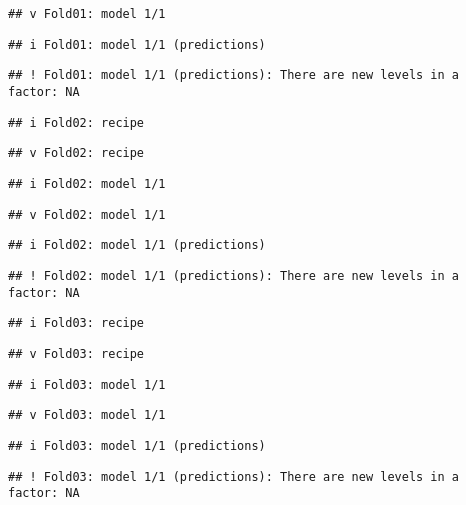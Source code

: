 \documentclass[
]{article}
\begin{document}
\begin{verbatim}
## v Fold01: model 1/1
\end{verbatim}

\begin{verbatim}
## i Fold01: model 1/1 (predictions)
\end{verbatim}

\begin{verbatim}
## ! Fold01: model 1/1 (predictions): There are new levels in a factor: NA
\end{verbatim}

\begin{verbatim}
## i Fold02: recipe
\end{verbatim}

\begin{verbatim}
## v Fold02: recipe
\end{verbatim}

\begin{verbatim}
## i Fold02: model 1/1
\end{verbatim}

\begin{verbatim}
## v Fold02: model 1/1
\end{verbatim}

\begin{verbatim}
## i Fold02: model 1/1 (predictions)
\end{verbatim}

\begin{verbatim}
## ! Fold02: model 1/1 (predictions): There are new levels in a factor: NA
\end{verbatim}

\begin{verbatim}
## i Fold03: recipe
\end{verbatim}

\begin{verbatim}
## v Fold03: recipe
\end{verbatim}

\begin{verbatim}
## i Fold03: model 1/1
\end{verbatim}

\begin{verbatim}
## v Fold03: model 1/1
\end{verbatim}

\begin{verbatim}
## i Fold03: model 1/1 (predictions)
\end{verbatim}

\begin{verbatim}
## ! Fold03: model 1/1 (predictions): There are new levels in a factor: NA
\end{verbatim}
\end{document}

